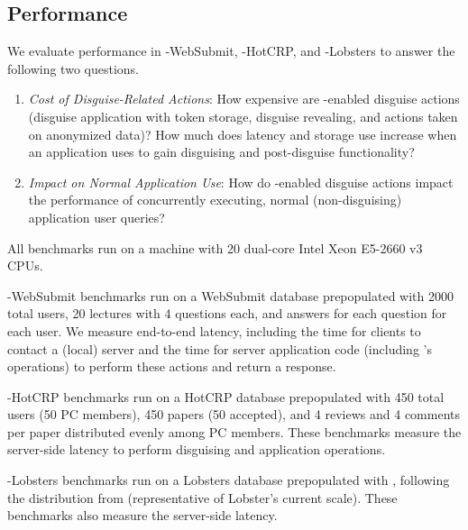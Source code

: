 \subsection{Performance}

We evaluate performance in \sys-WebSubmit, \sys-HotCRP, and \sys-Lobsters to answer the
following two questions.
\begin{enumerate}
\item \emph{Cost of Disguise-Related Actions}: How expensive are \sys-enabled disguise actions
(disguise application with token storage, disguise revealing, and actions taken on anonymized data)?
How much does latency and storage use increase when an application uses \sys to gain disguising and post-disguise functionality?
\item \emph{Impact on Normal Application Use}: How do \sys-enabled disguise actions impact the
    performance of concurrently executing, normal (non-disguising) application user queries?
\end{enumerate}

All benchmarks run on a machine with 20 dual-core Intel Xeon E5-2660 v3 CPUs.

\sys-WebSubmit benchmarks run on a WebSubmit database prepopulated with 2000 total users, 20 lectures
with 4 questions each, and answers for each question for each user.
We measure end-to-end latency, including the time for clients to contact a (local)
server and the time for server application code (including \sys's operations) to perform these
actions and return a response.

\sys-HotCRP benchmarks run on a HotCRP database prepopulated with 450 total users (50 PC members), 450
papers (50 accepted), and 4 reviews and 4 comments per paper distributed evenly among PC members.  
These benchmarks measure the server-side latency to perform disguising and application operations.

\sys-Lobsters benchmarks run on a Lobsters database prepopulated with , following the
distribution from  (representative of Lobster's current
scale). These benchmarks also measure the server-side latency.


